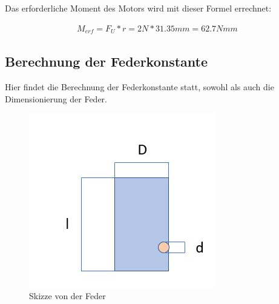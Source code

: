 Das erforderliche Moment des Motors wird mit dieser Formel errechnet:

\begin{align*}
M_{erf}=F_U*r=2N*31.35mm=62.7Nmm
\end{align*}
\newpage
\subsection{Berechnung der Federkonstante}
\label{Berechnung_Feder}

Hier findet die Berechnung der Federkonstante statt, sowohl als auch die Dimensionierung der Feder.

\begin{figure}[H]
   \begin{minipage}[hbt]{.4\linewidth} %
      \includegraphics[width=\linewidth]{Bilder/Powerpoint/Feder}
      \caption{Skizze von der Feder}
      \label{SkizzeFeder} 
   \end{minipage}
   \hspace{.1\linewidth}%
   \begin{minipage}[hbt]{.4\linewidth} %

\end{minipage}
\end{figure}
